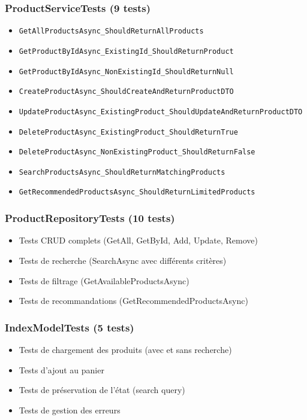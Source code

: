 \documentclass[12pt,a4paper]{article}
\begin{document}
\subsubsection{ProductServiceTests (9 tests)}

\begin{itemize}
    \item \texttt{GetAllProductsAsync\_ShouldReturnAllProducts}
    \item \texttt{GetProductByIdAsync\_ExistingId\_ShouldReturnProduct}
    \item \texttt{GetProductByIdAsync\_NonExistingId\_ShouldReturnNull}
    \item \texttt{CreateProductAsync\_ShouldCreateAndReturnProductDTO}
    \item \texttt{UpdateProductAsync\_ExistingProduct\_ShouldUpdateAndReturnProductDTO}
    \item \texttt{DeleteProductAsync\_ExistingProduct\_ShouldReturnTrue}
    \item \texttt{DeleteProductAsync\_NonExistingProduct\_ShouldReturnFalse}
    \item \texttt{SearchProductsAsync\_ShouldReturnMatchingProducts}
    \item \texttt{GetRecommendedProductsAsync\_ShouldReturnLimitedProducts}
\end{itemize}

\subsubsection{ProductRepositoryTests (10 tests)}

\begin{itemize}
    \item Tests CRUD complets (GetAll, GetById, Add, Update, Remove)
    \item Tests de recherche (SearchAsync avec différents critères)
    \item Tests de filtrage (GetAvailableProductsAsync)
    \item Tests de recommandations (GetRecommendedProductsAsync)
\end{itemize}

\subsubsection{IndexModelTests (5 tests)}

\begin{itemize}
    \item Tests de chargement des produits (avec et sans recherche)
    \item Tests d'ajout au panier
    \item Tests de préservation de l'état (search query)
    \item Tests de gestion des erreurs
\end{itemize}
\end{document}
